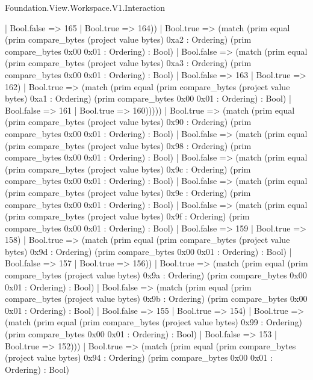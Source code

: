 \begin{lexlean}{Foundation.View.Workspace.V1.Interaction}
\begin{semanticmodule}
{                    | Bool.false => 165
                    | Bool.true => 164))
                | Bool.true => (match (prim equal (prim compare_bytes (project value bytes) 0xa2 : Ordering) (prim compare_bytes 0x00 0x01 : Ordering) : Bool)
                  | Bool.false => (match (prim equal (prim compare_bytes (project value bytes) 0xa3 : Ordering) (prim compare_bytes 0x00 0x01 : Ordering) : Bool)
                    | Bool.false => 163
                    | Bool.true => 162)
                  | Bool.true => (match (prim equal (prim compare_bytes (project value bytes) 0xa1 : Ordering) (prim compare_bytes 0x00 0x01 : Ordering) : Bool)
                    | Bool.false => 161
                    | Bool.true => 160)))))
          | Bool.true => (match (prim equal (prim compare_bytes (project value bytes) 0x90 : Ordering) (prim compare_bytes 0x00 0x01 : Ordering) : Bool)
            | Bool.false => (match (prim equal (prim compare_bytes (project value bytes) 0x98 : Ordering) (prim compare_bytes 0x00 0x01 : Ordering) : Bool)
              | Bool.false => (match (prim equal (prim compare_bytes (project value bytes) 0x9c : Ordering) (prim compare_bytes 0x00 0x01 : Ordering) : Bool)
                | Bool.false => (match (prim equal (prim compare_bytes (project value bytes) 0x9e : Ordering) (prim compare_bytes 0x00 0x01 : Ordering) : Bool)
                  | Bool.false => (match (prim equal (prim compare_bytes (project value bytes) 0x9f : Ordering) (prim compare_bytes 0x00 0x01 : Ordering) : Bool)
                    | Bool.false => 159
                    | Bool.true => 158)
                  | Bool.true => (match (prim equal (prim compare_bytes (project value bytes) 0x9d : Ordering) (prim compare_bytes 0x00 0x01 : Ordering) : Bool)
                    | Bool.false => 157
                    | Bool.true => 156))
                | Bool.true => (match (prim equal (prim compare_bytes (project value bytes) 0x9a : Ordering) (prim compare_bytes 0x00 0x01 : Ordering) : Bool)
                  | Bool.false => (match (prim equal (prim compare_bytes (project value bytes) 0x9b : Ordering) (prim compare_bytes 0x00 0x01 : Ordering) : Bool)
                    | Bool.false => 155
                    | Bool.true => 154)
                  | Bool.true => (match (prim equal (prim compare_bytes (project value bytes) 0x99 : Ordering) (prim compare_bytes 0x00 0x01 : Ordering) : Bool)
                    | Bool.false => 153
                    | Bool.true => 152)))
              | Bool.true => (match (prim equal (prim compare_bytes (project value bytes) 0x94 : Ordering) (prim compare_bytes 0x00 0x01 : Ordering) : Bool)
}
\end{semanticmodule}
\end{lexlean}
